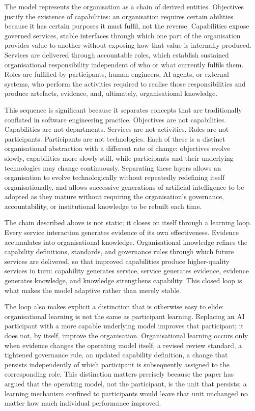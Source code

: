 \documentclass[
]{article}
\begin{document}
The model represents the organisation as a chain of derived entities.
Objectives justify the existence of capabilities: an organisation
requires certain abilities because it has certain purposes it must
fulfil, not the reverse. Capabilities expose governed services, stable
interfaces through which one part of the organisation provides value to
another without exposing how that value is internally produced. Services
are delivered through accountable roles, which establish sustained
organisational responsibility independent of who or what currently
fulfils them. Roles are fulfilled by participants, human engineers, AI
agents, or external systems, who perform the activities required to
realise those responsibilities and produce artefacts, evidence, and,
ultimately, organisational knowledge.

This sequence is significant because it separates concepts that are
traditionally conflated in software engineering practice. Objectives are
not capabilities. Capabilities are not departments. Services are not
activities. Roles are not participants. Participants are not
technologies. Each of these is a distinct organisational abstraction
with a different rate of change: objectives evolve slowly, capabilities
more slowly still, while participants and their underlying technologies
may change continuously. Separating these layers allows an organisation
to evolve technologically without repeatedly redefining itself
organisationally, and allows successive generations of artificial
intelligence to be adopted as they mature without requiring the
organisation's governance, accountability, or institutional knowledge to
be rebuilt each time.

The chain described above is not static; it closes on itself through a
learning loop. Every service interaction generates evidence of its own
effectiveness. Evidence accumulates into organisational knowledge.
Organisational knowledge refines the capability definitions, standards,
and governance rules through which future services are delivered, so
that improved capabilities produce higher-quality services in turn:
capability generates service, service generates evidence, evidence
generates knowledge, and knowledge strengthens capability. This closed
loop is what makes the model adaptive rather than merely stable.

The loop also makes explicit a distinction that is otherwise easy to
elide: organisational learning is not the same as participant learning.
Replacing an AI participant with a more capable underlying model
improves that participant; it does not, by itself, improve the
organisation. Organisational learning occurs only when evidence changes
the operating model itself, a revised review standard, a tightened
governance rule, an updated capability definition, a change that
persists independently of which participant is subsequently assigned to
the corresponding role. This distinction matters precisely because the
paper has argued that the operating model, not the participant, is the
unit that persists; a learning mechanism confined to participants would
leave that unit unchanged no matter how much individual performance
improved.
\end{document}
